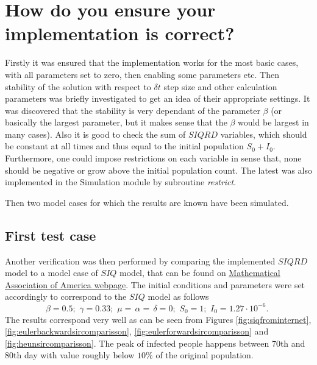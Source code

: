 \documentclass[a4paper]{article}
\begin{document}
\section{How do you ensure your implementation is correct?}
Firstly it was ensured that the implementation works for the most basic cases, with all parameters set to zero, then enabling some parameters etc. Then stability of the solution with respect to $ \delta t $ step size and other calculation parameters was briefly investigated to get an idea of their appropriate settings. It was discovered that the stability is very dependant of the parameter $ \beta $ (or basically the largest parameter, but it makes sense that the $ \beta $ would be largest in many cases). Also it is good to check the sum of $ SIQRD $ variables, which should be constant at all times and thus equal to the initial population $ S_0 + I_0 $. Furthermore, one could impose restrictions on each variable in sense that, none should be negative or grow above the initial population count. The latest was also implemented in the Simulation module by subroutine \textit{restrict}.

Then two model cases for which the results are known have been simulated.

\newpage
\subsection{First test case}
Another verification was then performed by comparing the implemented $ SIQRD $ model to a model case of $ SIQ $ model, that can be found on \href{https://www.maa.org/press/periodicals/loci/joma/the-sir-model-for-spread-of-disease-the-differential-equation-model}{Mathematical Association of America webpage}. The initial conditions and parameters were set accordingly to correspond to the $ SIQ $ model as follows
\begin{equation}\label{eq:parameters}
\beta = 0.5;\,\,
\gamma = 0.33;\,\,
\mu=\,\alpha=\,\delta = 0;\,\,
S_0 = 1;\,\,
I_0 = 1.27 \cdot 10^{-6}.\,\,
\end{equation}
The results correspond very well as can be seen from Figures  \ref{fig:siqfrominternet}, \ref{fig:eulerbackwardsircomparisson}, \ref{fig:eulerforwardsircomparisson} and \ref{fig:heunsircomparisson}. The peak of infected people happens between 70th and 80th day with value roughly below $ 10 \%$ of the original population.
\end{document}
